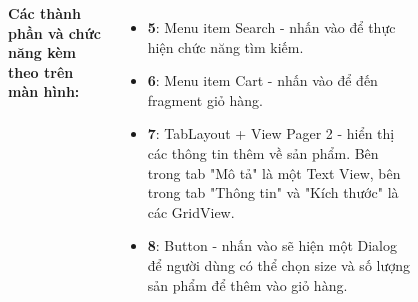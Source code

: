 \documentclass{beamer}
\begin{document}
\begin{frame}
\begin{columns}
\begin{figure}
        \end{figure}
        \indent \textbf{Các thành phần và chức năng kèm theo trên màn hình:}
        \begin{itemize}
            \item \textbf{5}: Menu item Search - nhấn vào để thực hiện chức năng tìm kiếm.
            \item \textbf{6}: Menu item Cart - nhấn vào để đến fragment giỏ hàng.
            \item \textbf{7}: TabLayout + View Pager 2 - hiển thị các thông tin thêm về sản phẩm. Bên trong tab "Mô tả" là một Text View, bên trong tab "Thông tin" và "Kích thước" là các GridView.
            \item \textbf{8}: Button - nhấn vào sẽ hiện một Dialog để người dùng có thể chọn size và số lượng sản phẩm để thêm vào giỏ hàng.     
        \end{itemize}
    \end{columns}
\end{frame}
\end{document}
